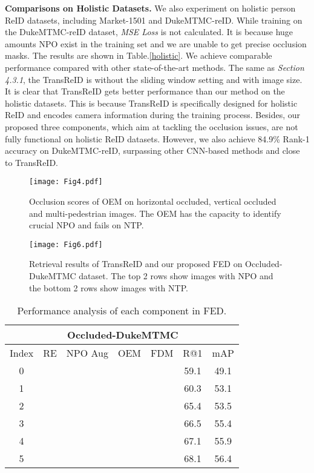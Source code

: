 \documentclass[10pt,twocolumn,letterpaper]{article}
\begin{document}
\textbf{Comparisons on Holistic Datasets.}
We also experiment on holistic person ReID datasets, including Market-1501 and DukeMTMC-reID. While training on the DukeMTMC-reID dataset, \emph{MSE Loss} is not calculated. It is because huge amounts NPO exist in the training set and we are unable to get precise occlusion masks. 
The results are shown in Table.\ref{holistic}. We achieve comparable performance compared with other state-of-the-art methods.
The same as \emph{Section 4.3.1}, the TransReID is without the sliding window setting and with  image size. It is clear that TransReID gets better performance than our method on the holistic datasets. This is because TransReID is specifically designed for holistic ReID and encodes camera information during the training process. Besides, our proposed three components, which aim at tackling the occlusion issues, are not fully functional on holistic ReID datasets. However, we also achieve 84.9\% Rank-1 accuracy on DukeMTMC-reID, surpassing other CNN-based methods and close to TransReID. 

\begin{figure}
  \centering
   \texttt{[image: Fig4.pdf]}
   \caption{Occlusion scores of OEM on horizontal occluded, vertical occluded and multi-pedestrian images. The OEM has the capacity to identify crucial NPO and fails on NTP.}
   \label{Fig4}
\end{figure}

\begin{figure*}
  \centering
   \texttt{[image: Fig6.pdf]}
   \caption{Retrieval results of TransReID and our proposed FED on Occluded-DukeMTMC dataset. The top 2 rows show images with NPO and the bottom 2 rows show images with NTP.}
   \label{Fig6}
\end{figure*}

\begin{table}[t]
	\centering
	\small
	\begin{tabular}{ccccccc}
	    \toprule
		\multicolumn{1}{c}{} & \multicolumn{5}{c}{Occluded-DukeMTMC}  \\
		\hline
		\multicolumn{1}{l}{Index} & RE & NPO Aug & OEM & FDM &  R@1 & mAP \\
		\hline
		\multicolumn{1}{c}{0} & \XSolidBrush & \XSolidBrush  & \XSolidBrush & \XSolidBrush  & 59.1 & 49.1 \\
		\multicolumn{1}{c}{1} & \Checkmark & \XSolidBrush  & \XSolidBrush & \XSolidBrush  & 60.3 & 53.1 \\
		\multicolumn{1}{c}{2} & \XSolidBrush & \Checkmark & \XSolidBrush & \XSolidBrush & 65.4 & 53.5  \\
		\multicolumn{1}{c}{3} & \XSolidBrush & \Checkmark & \Checkmark & \XSolidBrush & 66.5 & 55.4\\
		\multicolumn{1}{c}{4} & \XSolidBrush & \Checkmark & \XSolidBrush & \Checkmark & 67.1 & 55.9  \\
		\multicolumn{1}{c}{5} & \XSolidBrush & \Checkmark & \Checkmark & \Checkmark & 68.1 & 56.4 \\
		\bottomrule
	\end{tabular}
	\caption{Performance analysis of each component in FED. 
	}
	\label{ablation}
\end{table}
\end{document}
